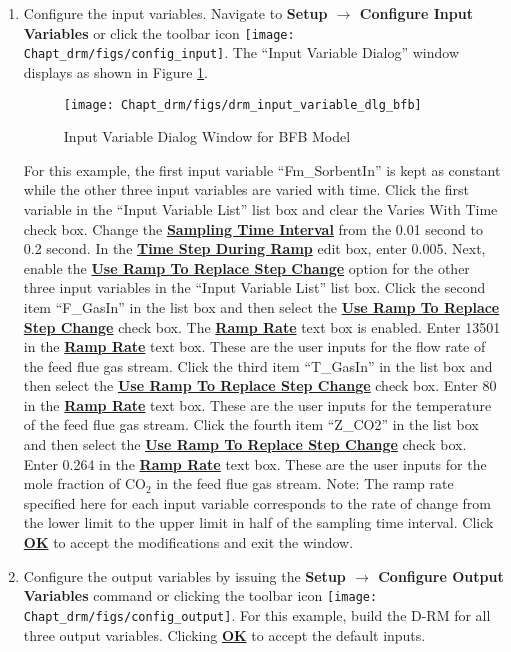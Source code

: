 \begin{enumerate}
	\item Configure the input variables.  Navigate to \textbf{Setup $\rightarrow$ Configure Input Variables} or click the toolbar icon \texttt{[image: Chapt\_drm/figs/config\_input]}.  The ``Input Variable Dialog'' window displays as shown in Figure \ref{fig.drm_input_variable_dlg_bfb}.
	\begin{figure}[H]
		\begin{center}
			\texttt{[image: Chapt\_drm/figs/drm\_input\_variable\_dlg\_bfb]}
			\caption{Input Variable Dialog Window for BFB Model}
			\label{fig.drm_input_variable_dlg_bfb}
		\end{center}
	\end{figure}
	For this example, the first input variable ``Fm\_SorbentIn'' is kept as constant while the other three input variables are varied with time.  Click the first variable in the ``Input Variable List'' list box and clear the Varies With Time check box.  Change the \textbf{\underline{Sampling Time Interval}} from the 0.01 second to 0.2 second.  In the \textbf{\underline{Time Step During Ramp}} edit box, enter 0.005.  Next, enable the \textbf{\underline{Use Ramp To Replace Step Change}} option for the other three input variables in the ``Input Variable List'' list box.  Click the second item ``F\_GasIn'' in the list box and then select the \textbf{\underline{Use Ramp To Replace Step Change}} check box.  The \textbf{\underline{Ramp Rate}} text box is enabled.  Enter 13501 in the \textbf{\underline{Ramp Rate}} text box.  These are the user inputs for the flow rate of the feed flue gas stream.  Click the third item ``T\_GasIn'' in the list box and then select the \textbf{\underline{Use Ramp To Replace Step Change}} check box.  Enter 80 in the \textbf{\underline{Ramp Rate}} text box.  These are the user inputs for the temperature of the feed flue gas stream.  Click the fourth item ``Z\_CO2'' in the list box and then select the \textbf{\underline{Use Ramp To Replace Step Change}} check box.  Enter 0.264 in the \textbf{\underline{Ramp Rate}} text box.  These are the user inputs for the mole fraction of CO$_2$ in the feed flue gas stream.  Note: The ramp rate specified here for each input variable corresponds to the rate of change from the lower limit to the upper limit in half of the sampling time interval.   Click \textbf{\underline{OK}} to accept the modifications and exit the window.
	\item Configure the output variables by issuing the \textbf{Setup $\rightarrow$ Configure Output Variables} command or clicking the toolbar icon \texttt{[image: Chapt\_drm/figs/config\_output]}.  For this example, build the D-RM for all three output variables.  Clicking \textbf{\underline{OK}} to accept the default inputs.

\end{enumerate}
